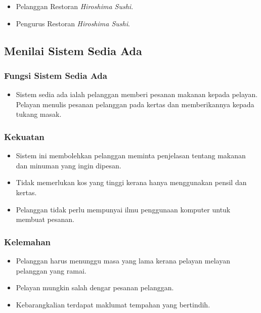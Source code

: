 \documentclass[main.tex]{subfiles}
\begin{document}
\begin{itemize}
    \item Pelanggan Restoran \textit{Hiroshima Sushi}.
    \item Pengurus Restoran \textit{Hiroshima Sushi}.
\end{itemize}

\subsection{Menilai Sistem Sedia Ada}

\subsubsection*{Fungsi Sistem Sedia Ada}

\begin{itemize}
    \item Sistem sedia ada ialah pelanggan memberi pesanan makanan kepada pelayan. Pelayan menulis pesanan pelanggan pada kertas dan memberikannya kepada tukang masak.
\end{itemize}

\newpage
\subsubsection*{Kekuatan}

\begin{itemize}
    \item Sistem ini membolehkan pelanggan meminta penjelasan tentang makanan dan minuman yang ingin dipesan.
    \item Tidak memerlukan kos yang tinggi kerana hanya menggunakan pensil dan kertas.
    \item Pelanggan tidak perlu mempunyai ilmu penggunaan komputer untuk membuat pesanan.
\end{itemize}

\subsubsection*{Kelemahan}

\begin{itemize}
    \item Pelanggan harus menunggu masa yang lama kerana pelayan melayan pelanggan yang ramai. 
    \item Pelayan mungkin salah dengar pesanan pelanggan.
    \item Kebarangkalian terdapat maklumat tempahan yang bertindih.
\end{itemize}
\end{document}
